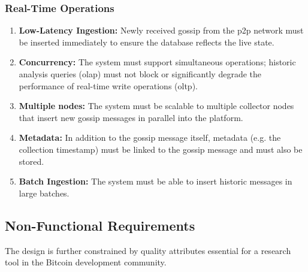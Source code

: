 \subsubsection{Real-Time Operations}
\begin{enumerate}[label=\textbf{RF\arabic*}, ref=RF\arabic*, resume, leftmargin=3.5em]
    \item \label{req:ingestion} \textbf{Low-Latency Ingestion:} 
        Newly received gossip from the \gls{p2p} network must be inserted 
        immediately to ensure the database reflects the live state.
    \item \label{req:concurrency} \textbf{Concurrency:} 
        The system must support simultaneous operations; historic analysis queries (\gls{olap}) 
        must not block or significantly degrade the performance of real-time write operations (\gls{oltp}).
    \item \label{req:multiple-nodes} \textbf{Multiple nodes:} 
        The system must be scalable to multiple collector nodes that insert 
        new gossip messages in parallel into the platform.
    \item \label{req:metadata}\textbf{Metadata:} 
        In addition to the gossip message itself, metadata (e.g. the collection timestamp) 
        must be linked to the gossip message and must also be stored.
    \item \label{req:batch-ingestion} \textbf{Batch Ingestion:} 
        The system must be able to insert historic messages in large batches.
\end{enumerate}


\subsection{Non-Functional Requirements}
The design is further constrained by quality attributes essential for a research tool in the Bitcoin development community.

